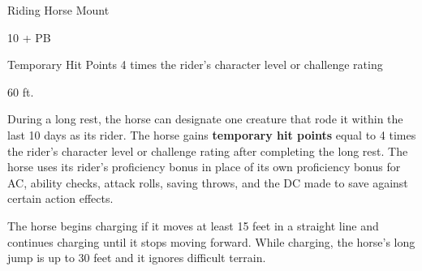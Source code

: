 \documentclass[letterpaper,twocolumn,openany,nodeprecatedcode]{dndbook}
\begin{document}
\begin{DndMonster}[float*=b,width=\textwidth + 8pt]{Riding Horse Mount}
  \begin{multicols}{2}

    \DndMonsterLine
    \begin {CustomBasics}
      \item[\armorclassname] 10 + PB
      \item[Temporary Hit Points] 4 times the rider's character level or challenge rating
      \item[\hitpointsname]  
      \item[\speedname] 60 ft.
    \end {CustomBasics}
    \DndMonsterLine

    \DndMonsterAbilityScores[
        str = 16,
        dex = 10,
        con = 12,
        int = 2,
        wis = 11,
        cha = 7,
      ]

    \DndMonsterDetails[
        senses = {passive Perception 10},
        languages = {-},
        challenge = 1/4,
      ]

    During a long rest, the horse can designate one creature that rode it within the last 10 days as its rider. The horse gains \textbf{temporary hit points} equal to 4 times the rider’s character level or challenge rating after completing the long rest. The horse uses its rider’s proficiency bonus in place of its own proficiency bonus for AC, ability checks, attack rolls, saving throws, and the DC made to save against certain action effects.

    The horse begins charging if it moves at least 15 feet in a straight line and continues charging until it stops moving forward. While charging, the horse’s long jump is up to 30 feet and it ignores difficult terrain.


    \DndMonsterAttack[
      name=Combat Stomp,
      distance=melee, %
      mod={+2 + PB},
      dmg=\DndDice{2d4 + 3},
      dmg-type=bludgeoning,
      extra={. If the target is a Medium or smaller creature, it must succeed on a DC 11 + PB Strength saving throw or be knocked prone.}
    ]


\end{multicols}
\end{DndMonster}
\end{document}

